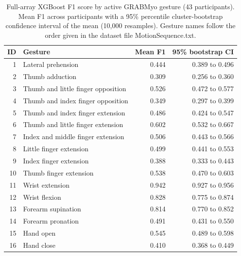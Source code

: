 \begin{table}[htbp]
\centering
\small
\caption{{Full-array XGBoost F1 score by active GRABMyo gesture (43 participants). Mean F1 across participants with a 95\% percentile cluster-bootstrap confidence interval of the mean (10,000 resamples). Gesture names follow the order given in the dataset file MotionSequence.txt.}}
\label{tab:gesture_audit}
\begin{tabular}{rlrr}
\toprule
ID & Gesture & Mean F1 & 95\% bootstrap CI \\
\midrule
1 & Lateral prehension & 0.444 & 0.389 to 0.496 \\
2 & Thumb adduction & 0.309 & 0.256 to 0.360 \\
3 & Thumb and little finger opposition & 0.526 & 0.472 to 0.577 \\
4 & Thumb and index finger opposition & 0.349 & 0.297 to 0.399 \\
5 & Thumb and index finger extension & 0.486 & 0.424 to 0.547 \\
6 & Thumb and little finger extension & 0.602 & 0.532 to 0.667 \\
7 & Index and middle finger extension & 0.506 & 0.443 to 0.566 \\
8 & Little finger extension & 0.499 & 0.441 to 0.553 \\
9 & Index finger extension & 0.388 & 0.333 to 0.443 \\
10 & Thumb finger extension & 0.538 & 0.470 to 0.603 \\
11 & Wrist extension & 0.942 & 0.927 to 0.956 \\
12 & Wrist flexion & 0.828 & 0.775 to 0.874 \\
13 & Forearm supination & 0.814 & 0.770 to 0.852 \\
14 & Forearm pronation & 0.491 & 0.431 to 0.550 \\
15 & Hand open & 0.545 & 0.489 to 0.598 \\
16 & Hand close & 0.410 & 0.368 to 0.449 \\
\bottomrule
\end{tabular}
\end{table}
